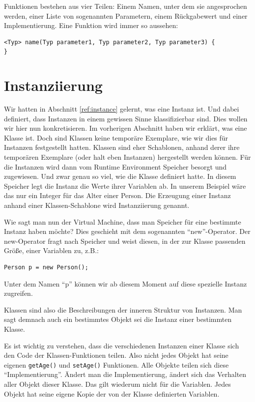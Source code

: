 Funktionen bestehen aus vier Teilen: Einem Namen, unter dem sie angesprochen werden, einer Liste von sogenannten Parametern, einem Rückgabewert und einer Implementierung. Eine Funktion wird immer so aussehen:
\begin{lstlisting}
<Typ> name(Typ parameter1, Typ parameter2, Typ parameter3) {
}
\end{lstlisting}




\section{Instanziierung}

Wir hatten in Abschnitt \ref{ref:instance} gelernt, was eine Instanz ist. Und dabei definiert, dass Instanzen in einem gewissen Sinne klassifizierbar sind. Dies wollen wir hier nun konkretisieren. Im vorherigen Abschnitt haben wir erklärt, was eine Klasse ist. Doch sind Klassen keine temporäre Exemplare, wie wir dies für Instanzen festgestellt hatten. Klassen sind eher Schablonen, anhand derer ihre temporären Exemplare (oder halt eben Instanzen) hergestellt werden können. Für die Instanzen wird dann vom Runtime Environment Speicher besorgt und zugewiesen. Und zwar genau so viel, wie die Klasse definiert hatte. In diesem Speicher legt die Instanz die Werte ihrer Variablen ab. In unserem Beispiel wäre das nur ein Integer für das Alter einer Person. Die Erzeugung einer Instanz anhand einer Klassen-Schablone wird Instanziierung genannt.

Wie sagt man nun der Virtual Machine, dass man Speicher für eine bestimmte Instanz haben möchte? Dies geschieht mit dem sogenannten "`new"'-Operator. Der new-Operator fragt nach Speicher und weist diesen, in der zur Klasse passenden Größe, einer Variablen zu, z.B.:
\begin{lstlisting}
Person p = new Person();
\end{lstlisting}
Unter dem Namen "`p"' können wir ab diesem Moment auf diese spezielle Instanz zugreifen.

Klassen sind also die Beschreibungen der inneren Struktur von Instanzen. Man sagt demnach auch ein bestimmtes Objekt sei die Instanz einer bestimmten Klasse. 

Es ist wichtig zu verstehen, dass die verschiedenen Instanzen einer Klasse sich den Code der Klassen-Funktionen teilen. Also nicht jedes Objekt hat seine eigenen \texttt{getAge()} und \texttt{setAge()} Funktionen. Alle Objekte teilen sich diese "`Implementierung"'. Ändert man die Implementierung, ändert sich das Verhalten aller Objekt dieser Klasse. Das gilt wiederum nicht für die Variablen. Jedes Objekt hat seine eigene Kopie der von der Klasse definierten Variablen. 

